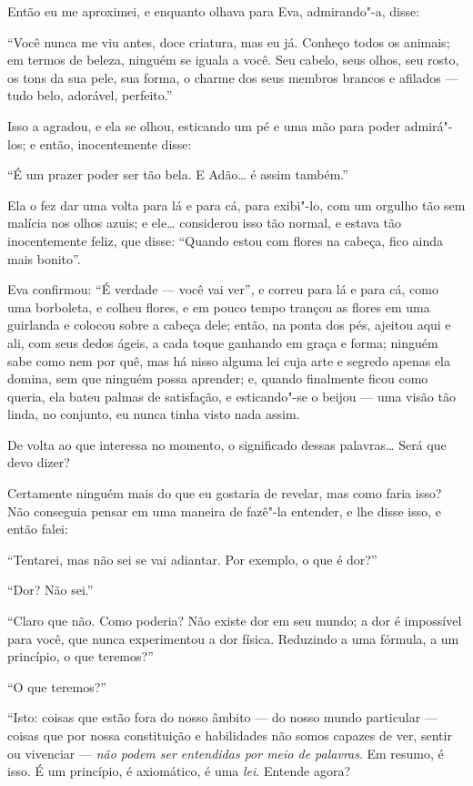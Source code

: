 Então eu me aproximei, e enquanto olhava para Eva, admirando"-a, disse:

“Você nunca me viu antes, doce criatura, mas eu já. Conheço todos os
animais; em termos de beleza, ninguém se iguala a você. Seu cabelo,
seus olhos, seu rosto, os tons da sua pele, sua forma, o charme dos seus
membros brancos e afilados --- tudo belo, adorável, perfeito.”

Isso a agradou, e ela se olhou, esticando um pé e uma mão para poder
admirá"-los; e então, inocentemente disse:

“É um prazer poder ser tão bela. E Adão\ldots{} é assim também.”

Ela o fez dar uma volta para lá e para cá, para
exibi"-lo, com um orgulho tão sem malícia nos olhos
azuis; e ele\ldots{} considerou isso tão normal, e estava tão
inocentemente feliz, que disse: ``Quando estou com flores na
cabeça, fico ainda mais bonito''.

Eva confirmou: ``É verdade --- você vai ver'', e
correu para lá e para cá, como uma borboleta, e colheu
flores, e em pouco tempo trançou as flores em uma guirlanda e colocou
sobre a cabeça dele; então, na ponta dos pés, ajeitou aqui e ali, com seus
dedos ágeis, a cada toque ganhando em graça e forma; ninguém sabe como nem
por quê, mas há nisso alguma lei cuja arte e segredo apenas ela domina,
sem que ninguém possa aprender; e, quando finalmente ficou como queria,
ela bateu palmas de satisfação, e esticando"-se o beijou
--- uma visão tão linda, no conjunto, eu nunca
tinha visto nada assim.

De volta ao que interessa no momento, o significado dessas palavras\ldots{}
Será que devo dizer?

Certamente ninguém mais do que eu gostaria de revelar, mas como faria isso? Não
conseguia pensar em uma maneira de fazê"-la entender, e lhe disse isso, e
então falei:

“Tentarei, mas não sei se vai adiantar. Por exemplo, o que é dor?”

“Dor? Não sei.”

“Claro que não. Como poderia? Não existe dor em seu mundo; a dor é
impossível para você, que nunca experimentou a dor física. Reduzindo a
uma fórmula, a um princípio, o que teremos?”

“O que teremos?”

“Isto: coisas que estão fora do nosso âmbito --- do nosso mundo particular ---
coisas que por nossa constituição e habilidades não
somos capazes de ver, sentir ou vivenciar --- \textit{não podem ser
entendidas por meio de palavras}. Em resumo, é isso. É um
princípio, é axiomático, é uma \textit{lei}. Entende agora?

